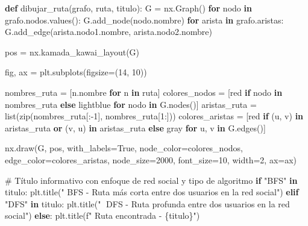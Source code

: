 \documentclass[
  spanish,
  letterpaper,
  DIV=11,
  numbers=noendperiod]{scrartcl}
\newenvironment{Shaded}{\begin{snugshade}}{\end{snugshade}}
\newcommand{\BuiltInTok}[1]{\textcolor[rgb]{0.00,0.23,0.31}{#1}}
\newcommand{\CommentTok}[1]{\textcolor[rgb]{0.37,0.37,0.37}{#1}}
\newcommand{\ControlFlowTok}[1]{\textcolor[rgb]{0.00,0.23,0.31}{\textbf{#1}}}
\newcommand{\DecValTok}[1]{\textcolor[rgb]{0.68,0.00,0.00}{#1}}
\newcommand{\KeywordTok}[1]{\textcolor[rgb]{0.00,0.23,0.31}{\textbf{#1}}}
\newcommand{\NormalTok}[1]{\textcolor[rgb]{0.00,0.23,0.31}{#1}}
\newcommand{\OperatorTok}[1]{\textcolor[rgb]{0.37,0.37,0.37}{#1}}
\newcommand{\SpecialCharTok}[1]{\textcolor[rgb]{0.37,0.37,0.37}{#1}}
\newcommand{\SpecialStringTok}[1]{\textcolor[rgb]{0.13,0.47,0.30}{#1}}
\newcommand{\StringTok}[1]{\textcolor[rgb]{0.13,0.47,0.30}{#1}}
\newcommand{\VariableTok}[1]{\textcolor[rgb]{0.07,0.07,0.07}{#1}}
\begin{document}
\begin{Shaded}
\begin{Highlighting}[]
\KeywordTok{def}\NormalTok{ dibujar\_ruta(grafo, ruta, titulo):}
\NormalTok{    G }\OperatorTok{=}\NormalTok{ nx.Graph()}
    \ControlFlowTok{for}\NormalTok{ nodo }\KeywordTok{in}\NormalTok{ grafo.nodos.values():}
\NormalTok{        G.add\_node(nodo.nombre)}
    \ControlFlowTok{for}\NormalTok{ arista }\KeywordTok{in}\NormalTok{ grafo.aristas:}
\NormalTok{        G.add\_edge(arista.nodo1.nombre, arista.nodo2.nombre)}

\NormalTok{    pos }\OperatorTok{=}\NormalTok{ nx.kamada\_kawai\_layout(G)}

\NormalTok{    fig, ax }\OperatorTok{=}\NormalTok{ plt.subplots(figsize}\OperatorTok{=}\NormalTok{(}\DecValTok{14}\NormalTok{, }\DecValTok{10}\NormalTok{))}

\NormalTok{    nombres\_ruta }\OperatorTok{=}\NormalTok{ [n.nombre }\ControlFlowTok{for}\NormalTok{ n }\KeywordTok{in}\NormalTok{ ruta]}
\NormalTok{    colores\_nodos }\OperatorTok{=}\NormalTok{ [}\StringTok{\textquotesingle{}red\textquotesingle{}} \ControlFlowTok{if}\NormalTok{ nodo }\KeywordTok{in}\NormalTok{ nombres\_ruta }\ControlFlowTok{else} \StringTok{\textquotesingle{}lightblue\textquotesingle{}} \ControlFlowTok{for}\NormalTok{ nodo }\KeywordTok{in}\NormalTok{ G.nodes()]}
\NormalTok{    aristas\_ruta }\OperatorTok{=} \BuiltInTok{list}\NormalTok{(}\BuiltInTok{zip}\NormalTok{(nombres\_ruta[:}\OperatorTok{{-}}\DecValTok{1}\NormalTok{], nombres\_ruta[}\DecValTok{1}\NormalTok{:]))}
\NormalTok{    colores\_aristas }\OperatorTok{=}\NormalTok{ [}\StringTok{\textquotesingle{}red\textquotesingle{}} \ControlFlowTok{if}\NormalTok{ (u, v) }\KeywordTok{in}\NormalTok{ aristas\_ruta }\KeywordTok{or}\NormalTok{ (v, u) }\KeywordTok{in}\NormalTok{ aristas\_ruta }\ControlFlowTok{else} \StringTok{\textquotesingle{}gray\textquotesingle{}} \ControlFlowTok{for}\NormalTok{ u, v }\KeywordTok{in}\NormalTok{ G.edges()]}

\NormalTok{    nx.draw(G, pos, with\_labels}\OperatorTok{=}\VariableTok{True}\NormalTok{, node\_color}\OperatorTok{=}\NormalTok{colores\_nodos, edge\_color}\OperatorTok{=}\NormalTok{colores\_aristas,}
\NormalTok{            node\_size}\OperatorTok{=}\DecValTok{2000}\NormalTok{, font\_size}\OperatorTok{=}\DecValTok{10}\NormalTok{, width}\OperatorTok{=}\DecValTok{2}\NormalTok{, ax}\OperatorTok{=}\NormalTok{ax)}

    \CommentTok{\# Título informativo con enfoque de red social y tipo de algoritmo}
    \ControlFlowTok{if} \StringTok{"BFS"} \KeywordTok{in}\NormalTok{ titulo:}
\NormalTok{        plt.title(}\StringTok{" BFS {-} Ruta más corta entre dos usuarios en la red social"}\NormalTok{)}
    \ControlFlowTok{elif} \StringTok{"DFS"} \KeywordTok{in}\NormalTok{ titulo:}
\NormalTok{        plt.title(}\StringTok{"🔶 DFS {-} Ruta profunda entre dos usuarios en la red social"}\NormalTok{)}
    \ControlFlowTok{else}\NormalTok{:}
\NormalTok{        plt.title(}\SpecialStringTok{f" Ruta encontrada {-} }\SpecialCharTok{\{}\NormalTok{titulo}\SpecialCharTok{\}}\SpecialStringTok{"}\NormalTok{)}


\end{Highlighting}
\end{Shaded}
\end{document}
